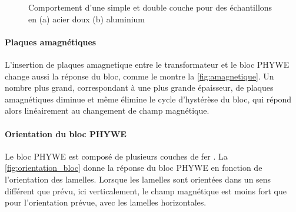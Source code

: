 \begin{figure}[h]
\begin{subfigure}{0.5\linewidth}
        \caption{}
        \label{fig:alu_combo}
    \end{subfigure}
    \caption{Comportement d'une simple et double couche pour des échantillons en (a) acier doux (b) aluminium}
    \label{fig:combo}
\end{figure}

\paragraph{Plaques amagnétiques}
L'insertion de plaques amagnetique entre le transformateur et le bloc PHYWE change aussi la réponse du bloc, comme le montre la \autoref{fig:amagnetique}. Un nombre plus grand, correspondant à une plus grande épaisseur, de plaques amagnétiques diminue et même élimine le cycle d'hystérèse du bloc, qui répond alors linéairement au changement de champ magnétique.

\paragraph{Orientation du bloc PHYWE}
Le bloc PHYWE est composé de plusieurs couches de fer \cite{bloc_phywe}. La \autoref{fig:orientation_bloc} donne la réponse du bloc PHYWE en fonction de l'orientation des lamelles. Lorsque les lamelles sont orientées dans un sens différent que prévu, ici verticalement, le champ magnétique est moins fort que pour l'orientation prévue, avec les lamelles horizontales.

